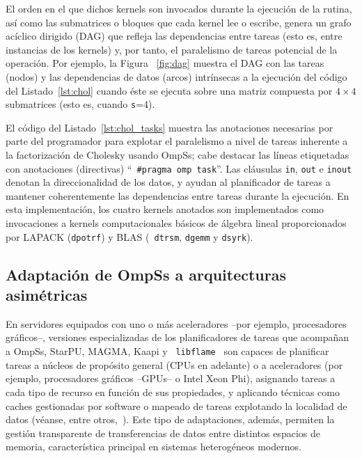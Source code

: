 El orden en el que dichos kernels son invocados durante la ejecución de la
rutina, así como las submatrices o bloques que cada kernel lee o escribe,
genera un grafo acíclico dirigido (DAG) que refleja las dependencias entre
tareas (esto es, entre instancias de los kernels) y, por tanto, el
paralelismo de tareas potencial de la operación.  Por ejemplo, la Figura
~\ref{fig:dag} muestra el DAG con las tareas (nodos) y las dependencias de
datos (arcos) intrínsecas a la ejecución del código del
Listado~\ref{lst:chol} cuando éste se ejecuta sobre una matriz compuesta
por $4 \times 4$ submatrices (esto es, cuando {\tt s}=4).

El código del Listado~\ref{lst:chol_tasks} muestra las anotaciones
necesarias por parte del programador para explotar el paralelismo a nivel
de tareas inherente a la factorización de Cholesky usando OmpSs; cabe
destacar las líneas etiquetadas con anotaciones (directivas) ``{\tt
  \#pragma omp task}''.  Las cláusulas {\tt in}, {\tt out} e {\tt inout}
denotan la direccionalidad de los datos, y ayudan al planificador de tareas
a mantener coherentemente las dependencias entre tareas durante la
ejecución.  En esta implementación, los cuatro kernels anotados son
implementados como invocaciones a kernels computacionales básicos de
álgebra lineal proporcionados por LAPACK ({\tt dpotrf}) y BLAS ({\tt
  dtrsm}, {\tt dgemm} y {\tt dsyrk}).



\subsection{Adaptación de OmpSs a arquitecturas asimétricas}
\label{s3:botlev}

En servidores equipados con uno o más aceleradores \mbox{--por} ejemplo,
procesadores \mbox{gráficos--,} versiones especializadas de los planificadores de
tareas que acompañan a OmpSs, StarPU, MAGMA, Kaapi y {\tt
  libflame}~\cite{libflameref} son capaces de planificar tareas a núcleos
de propósito general (CPUs en adelante) o a aceleradores (por ejemplo,
procesadores gráficos --GPUs-- o Intel Xeon Phi), asignando tareas a cada
tipo de recurso en función de sus propiedades, y aplicando técnicas como
caches gestionadas por software o mapeado de tareas explotando la localidad
de datos (véanse, entre
otros,~\cite{Quintana:2008:PMA,CPE:CPE1463,Augonnet:2011:SUP:1951453.1951454,5470941,Gautier:2013:XRS:2510661.2511383}). Este
tipo de adaptaciones, además, permiten la gestión transparente de
transferencias de datos entre distintos espacios de memoria, característica
principal en sistemas heterogéneos modernos.





